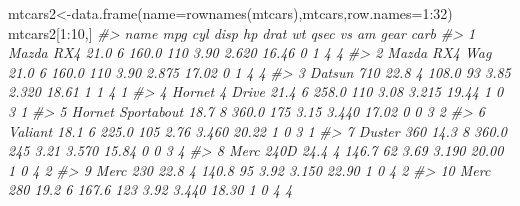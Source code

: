 \documentclass[
]{book}
\newenvironment{Shaded}{\begin{snugshade}}{\end{snugshade}}
\newcommand{\AttributeTok}[1]{\textcolor[rgb]{0.77,0.63,0.00}{#1}}
\newcommand{\CommentTok}[1]{\textcolor[rgb]{0.56,0.35,0.01}{\textit{#1}}}
\newcommand{\DecValTok}[1]{\textcolor[rgb]{0.00,0.00,0.81}{#1}}
\newcommand{\FunctionTok}[1]{\textcolor[rgb]{0.00,0.00,0.00}{#1}}
\newcommand{\NormalTok}[1]{#1}
\newcommand{\OtherTok}[1]{\textcolor[rgb]{0.56,0.35,0.01}{#1}}
\newcommand{\SpecialCharTok}[1]{\textcolor[rgb]{0.00,0.00,0.00}{#1}}
\begin{document}
\begin{Shaded}
\end{Shaded}

\begin{Shaded}
\begin{Highlighting}[]
\NormalTok{mtcars2}\OtherTok{\textless{}{-}}\FunctionTok{data.frame}\NormalTok{(}\AttributeTok{name=}\FunctionTok{rownames}\NormalTok{(mtcars),mtcars,}\AttributeTok{row.names=}\DecValTok{1}\SpecialCharTok{:}\DecValTok{32}\NormalTok{)}
\NormalTok{mtcars2[}\DecValTok{1}\SpecialCharTok{:}\DecValTok{10}\NormalTok{,]}
\CommentTok{\#\textgreater{}                 name  mpg cyl  disp  hp drat    wt  qsec vs am gear carb}
\CommentTok{\#\textgreater{} 1          Mazda RX4 21.0   6 160.0 110 3.90 2.620 16.46  0  1    4    4}
\CommentTok{\#\textgreater{} 2      Mazda RX4 Wag 21.0   6 160.0 110 3.90 2.875 17.02  0  1    4    4}
\CommentTok{\#\textgreater{} 3         Datsun 710 22.8   4 108.0  93 3.85 2.320 18.61  1  1    4    1}
\CommentTok{\#\textgreater{} 4     Hornet 4 Drive 21.4   6 258.0 110 3.08 3.215 19.44  1  0    3    1}
\CommentTok{\#\textgreater{} 5  Hornet Sportabout 18.7   8 360.0 175 3.15 3.440 17.02  0  0    3    2}
\CommentTok{\#\textgreater{} 6            Valiant 18.1   6 225.0 105 2.76 3.460 20.22  1  0    3    1}
\CommentTok{\#\textgreater{} 7         Duster 360 14.3   8 360.0 245 3.21 3.570 15.84  0  0    3    4}
\CommentTok{\#\textgreater{} 8          Merc 240D 24.4   4 146.7  62 3.69 3.190 20.00  1  0    4    2}
\CommentTok{\#\textgreater{} 9           Merc 230 22.8   4 140.8  95 3.92 3.150 22.90  1  0    4    2}
\CommentTok{\#\textgreater{} 10          Merc 280 19.2   6 167.6 123 3.92 3.440 18.30  1  0    4    4}
\end{Highlighting}
\end{Shaded}
\end{document}
